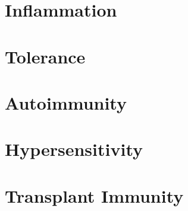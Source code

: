 
\section{Inflammation}
  \label{sec:inflammation}

\section{Tolerance}

\section{Autoimmunity}

\section{Hypersensitivity}

\section{Transplant Immunity}
